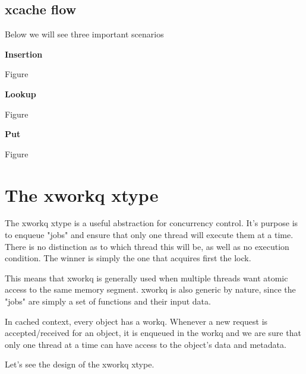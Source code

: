 \subsection{xcache flow}

Below we will see three important scenarios

\textbf{Insertion}

Figure

\textbf{Lookup}

Figure

\textbf{Put}

Figure

\section{The xworkq xtype}\label{sec:xworkq-design}

The xworkq xtype is a useful abstraction for concurrency control. It's purpose 
is to enqueue "jobs" and ensure that only one thread will execute them at a 
time. There is no distinction as to which thread this will be, as well as no 
execution condition. The winner is simply the one that acquires first the lock.

This means that xworkq is generally used when multiple threads want atomic 
access to the same memory segment. xworkq is also generic by nature, since the 
"jobs" are simply a set of functions and their input data.

In cached context, every object has a workq. Whenever a new request is 
accepted/received for an object, it is enqueued in the workq and we are sure 
that only one thread at a time can have access to the object's data and 
metadata.

\begin{comment}
	This is wrong, xworkq understands only jobs.
on object level.  It is important to distinguish between cache level operations 
and object level operations. Cache level operations include insertions, lookups, 
removals, allocations and refcount handling. On object level, there is a 
different set of operations that must be synchronized across threads. Namely, we 
have bucket claiming, read/write operations and object flushes.

The above distinction makes it easy to see that provided that operations on 
object level need not worry about interactions with other objects. Each object 
is "sandboxed", so to speak.
\end{comment}

Let's see the design of the xworkq xtype. 

